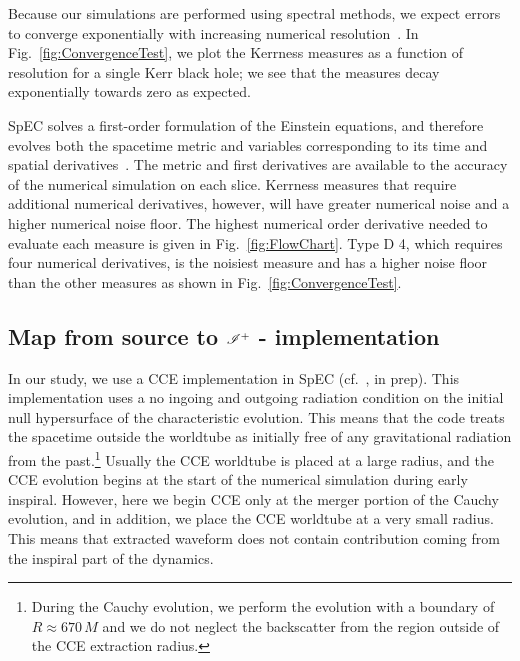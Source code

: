 Because our simulations are performed using spectral methods, we expect errors to converge exponentially with increasing numerical resolution~\cite{Press:2007:NRE:1403886}.  In Fig.~\ref{fig:ConvergenceTest}, we plot the Kerrness measures as a function of resolution for a single Kerr black hole; we see that the measures decay exponentially towards zero as expected.

SpEC solves a first-order formulation of the Einstein equations, and therefore evolves both the spacetime metric and variables corresponding to its time and spatial derivatives~\cite{Lindblom:2005qh}. The metric and first derivatives are available to the accuracy of the numerical simulation on each slice. Kerrness measures that require additional numerical derivatives, however, will have greater numerical noise and a higher numerical noise floor. The highest numerical order derivative needed to evaluate each measure is given in Fig.~\ref{fig:FlowChart}. Type D 4, which requires four numerical derivatives, is the noisiest measure and has a higher noise floor than the other measures\Mark{,} as shown in Fig.~\ref{fig:ConvergenceTest}.



\subsection{Map from source to $\mathscr{I^+}$ - implementation}
\label{sec:AFQ_implementation}
\alg

\phiplot

In our study, we use a CCE implementation in SpEC (cf.~\cite{Kevin}, in prep). This implementation uses
a no ingoing and outgoing radiation condition on the initial null hypersurface of the characteristic evolution. This means that the code treats the spacetime outside the worldtube as initially free of any gravitational radiation from the past.\footnote{During the Cauchy evolution, we perform the evolution with a boundary of $R \approx 670\,M$ and we do not neglect the backscatter from the region outside of the CCE extraction radius.} Usually the CCE worldtube is placed at a large radius, and the CCE evolution begins at the start of the numerical simulation during early inspiral. However, here we begin CCE only at the merger portion of the Cauchy evolution, and in addition, we place the CCE worldtube at a very small radius. This means that extracted waveform does not contain contribution coming from the inspiral part of the dynamics. 

